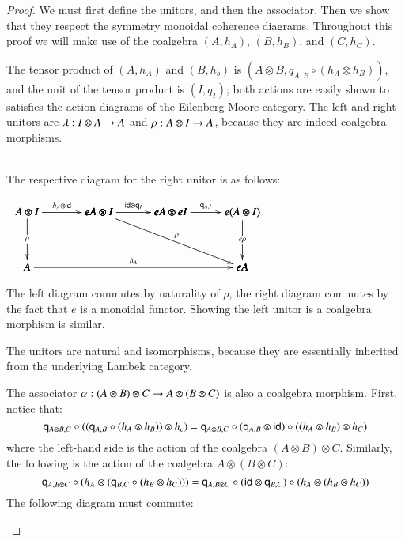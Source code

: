 \begin{proof}
  We must first define the unitors, and then the associator.  Then we
  show that they respect the symmetry monoidal coherence diagrams.
  Throughout this proof we will make use of the coalgebra $(A,h_A)$,
  $(B,h_B)$, and $(C,h_C)$.

  The tensor product of $(A, h_A)$ and $(B, h_b)$ is $(A \otimes
  B,q_{A,B} \circ (h_A \otimes h_B))$, and the unit of the tensor
  product is $(I, q_I)$; both actions are easily shown to satisfies
  the action diagrams of the Eilenberg Moore category. The left and
  right unitors are $\lambda : I \otimes A \rightarrow A$ and $\rho : A
  \otimes I \rightarrow A$, because they are indeed coalgebra morphisms.

  \ \\
  \noindent
  The respective diagram for the right unitor is as follows:
  \begin{center}
    \begin{math}
      \begin{array}{lll}
        \bfig
        \square|amma|/->`->``/<650,500>[A \otimes I`eA \otimes I`A`;h_A \otimes \id{}`\rho``]
        \morphism(650,500)<650,0>[eA \otimes I`eA \otimes eI;\id{} \otimes \q{I}]
        \square(1300,0)|amma|/->``->`/<650,500>[eA \otimes eI`e(A \otimes I)``eA;\q{A,I}``e\rho`]

        \morphism(650,500)<1300,-500>[eA \otimes I`eA;\rho]
        \morphism<1950,0>[A`eA;h_A]
        \efig
      \end{array}
    \end{math}
  \end{center}
  The left diagram commutes by naturality of $\rho$, the right diagram
  commutes by the fact that $e$ is a monoidal functor.  Showing the
  left unitor is a coalgebra morphism is similar.

  The unitors are natural and isomorphisms, because they are
  essentially inherited from the underlying Lambek category.

  The associator $\alpha : (A \otimes B) \otimes C \rightarrow A \otimes (B
  \otimes C)$ is also a coalgebra morphism.  First, notice that:
  \[\mathsf{q}_{A \otimes B,C} \circ ((\mathsf{q}_{A,B} \circ (h_A \otimes h_B)) \otimes h_c) = \mathsf{q}_{A \otimes B,C} \circ (\mathsf{q}_{A,B} \otimes \mathsf{id}{}) \circ ((h_A \otimes h_B) \otimes h_C)\]
  where the left-hand side is the action of the coalgebra $(A \otimes B)
  \otimes C$. Similarly, the following is the action of the coalgebra
  $A \otimes (B \otimes C)$:
  \[
  \mathsf{q}_{A,B \otimes C} \circ (h_A \otimes (\mathsf{q}_{B,C} \circ (h_B \otimes h_C))) = \mathsf{q}_{A,B \otimes C} \circ (\mathsf{id}{} \otimes \mathsf{q}_{B,C}) \circ (h_A \otimes (h_B \otimes h_C))
  \]
  The following diagram must commute:
  \begin{center}
\end{center}
\end{proof}
